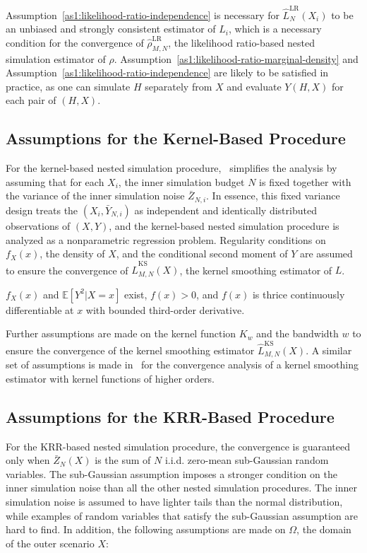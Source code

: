 Assumption~\ref{as1:likelihood-ratio-independence} is necessary for $\hat{L}^{\text{LR}}_N(X_i)$ to be an unbiased and strongly consistent estimator of $L_i$, which is a necessary condition for the convergence of $\hat{\rho}^{\text{LR}}_{M,N}$, the likelihood ratio-based nested simulation estimator of $\rho$.
Assumption~\ref{as1:likelihood-ratio-marginal-density} and Assumption~\ref{as1:likelihood-ratio-independence} are likely to be satisfied in practice, as one can simulate $H$ separately from $X$ and evaluate $Y(H, X)$ for each pair of $(H, X)$.

\subsection{Assumptions for the Kernel-Based Procedure}
For the kernel-based nested simulation procedure,~\cite{hong2017kernel} simplifies the analysis by assuming that for each $X_i$, the inner simulation budget $N$ is fixed together with the variance of the inner simulation noise $\bar{Z}_{N, i}$.
In essence, this fixed variance design treats the $(X_i, \bar{Y}_{N, i})$ as independent and identically distributed observations of $(X, Y)$, and the kernel-based nested simulation procedure is analyzed as a nonparametric regression problem.
Regularity conditions on $f_X(x)$, the density of $X$, and the conditional second moment of $Y$ are assumed to ensure the convergence of $\hat{L}^{\text{KS}}_{M, N}(X)$, the kernel smoothing estimator of $L$.

\begin{assumption}
    $f_X(x)$ and $\mathbb{E} \left[ Y^2 | X = x \right]$ exist, $f(x) > 0$, and $f(x)$ is thrice continuously differentiable at $x$ with bounded third-order derivative.
\end{assumption}

Further assumptions are made on the kernel function $K_w$ and the bandwidth $w$ to ensure the convergence of the kernel smoothing estimator $\hat{L}^{\text{KS}}_{M, N}(X)$.
A similar set of assumptions is made in~\cite{jennen1988unifying} for the convergence analysis of a kernel smoothing estimator with kernel functions of higher orders.

\subsection{Assumptions for the KRR-Based Procedure}
For the KRR-based nested simulation procedure, the convergence is guaranteed only when $\bar{Z}_N(X)$ is the sum of $N$ i.i.d. zero-mean sub-Gaussian random variables.
The sub-Gaussian assumption imposes a stronger condition on the inner simulation noise than all the other nested simulation procedures.
The inner simulation noise is assumed to have lighter tails than the normal distribution, while examples of random variables that satisfy the sub-Gaussian assumption are hard to find.
In addition, the following assumptions are made on $\Omega$, the domain of the outer scenario $X$:


